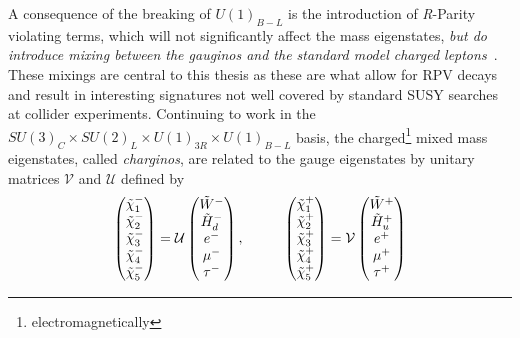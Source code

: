 A consequence of the breaking of $U(1)_{B-L}$ is the introduction of \emph{R}-Parity violating terms, which will not significantly affect the mass eigenstates, \emph{but do introduce mixing between the gauginos and the standard model charged leptons}~\cite{Dumitru:2018jyb}.
These mixings are central to this thesis as these are what allow for RPV decays and result in interesting signatures not well covered by standard SUSY searches at collider experiments.
Continuing to work in the $SU(3)_{C} \times SU(2)_{L} \times U(1)_{3R} \times U(1)_{B-L}$ basis, the charged\footnote{electromagnetically} mixed mass eigenstates, called \emph{charginos}, are related to the gauge eigenstates by unitary matrices $\mathcal{V}$ and $\mathcal{U}$ defined by 
\begin{align}
    \begin{pmatrix}
       \tilde\chi_{1}^{-} \\
       \tilde\chi_{2}^{-} \\
       \tilde\chi_{3}^{-} \\
       \tilde\chi_{4}^{-} \\
       \tilde\chi_{5}^{-} 
    \end{pmatrix}
    =\mathcal{U} 
    \begin{pmatrix}
      \tilde W^{-}\\ 
      \tilde H_{d}^{-}\\ 
      e^{-} \\ 
      \mu^{-} \\ 
      \tau^{-} 
    \end{pmatrix},\hspace{1.0cm}
    \begin{pmatrix}
       \tilde\chi_{1}^{+} \\
       \tilde\chi_{2}^{+} \\
       \tilde\chi_{3}^{+} \\
       \tilde\chi_{4}^{+} \\
       \tilde\chi_{5}^{+} 
    \end{pmatrix}
    =\mathcal{V} 
    \begin{pmatrix}
      \tilde W^{+} \\ 
      \tilde H_{u}^{+} \\ 
      e^{+} \\ 
      \mu^{+} \\ 
      \tau^{+} 
    \end{pmatrix}
\end{align}
